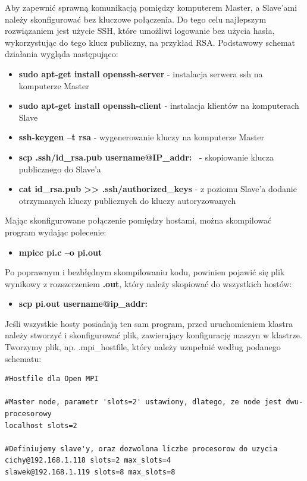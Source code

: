 \documentclass[a4paper,12pt]{article}		%
\begin{document}
Aby zapewnić sprawną komunikacją pomiędzy komputerem Master, a Slave’ami należy skonfigurować bez kluczowe połączenia. Do tego celu najlepszym rozwiązaniem jest użycie SSH, które umożliwi logowanie bez użycia hasła, wykorzystując do tego klucz publiczny, na przykład RSA. Podstawowy schemat działania wygląda następująco:
\begin{itemize}
\item \textbf{sudo apt-get install openssh-server} - instalacja serwera ssh na komputerze Master
\item \textbf{sudo apt-get install openssh-client} - instalacja klientów na komputerach Slave
\item \textbf{ssh-keygen –t rsa} - wygenerowanie kluczy na komputerze Master
\item \textbf{scp .ssh/id\_rsa.pub username@IP\_addr:~} - skopiowanie klucza publicznego do Slave'a
\item \textbf{cat id\_rsa.pub >> .ssh/authorized\_keys} - z poziomu Slave'a dodanie otrzymanych kluczy publicznych do  kluczy autoryzowanych
\end{itemize}

Mając skonfigurowane połączenie pomiędzy hostami, można skompilować program wydając polecenie: 

\begin{itemize}
\item \textbf{mpicc pi.c –o pi.out}
\end{itemize}

Po poprawnym i bezbłędnym skompilowaniu kodu, powinien pojawić się plik wynikowy z rozszerzeniem \textbf{.out}, który należy skopiować do wszystkich hostów:

\begin{itemize}
\item \textbf{scp pi.out username@ip\_addr:~}
\end{itemize}

Jeśli wszystkie hosty posiadają ten sam program, przed uruchomieniem klastra należy stworzyć i skonfigurować plik, zawierający konfigurację maszyn w klastrze. Tworzymy plik, np. .mpi\_hostfile, który należy uzupełnić według podanego schematu:

\begin{lstlisting}
#Hostfile dla Open MPI

#Master node, parametr 'slots=2' ustawiony, dlatego, ze node jest dwu-procesorowy
localhost slots=2

#Definiujemy slave'y, oraz dozwolona liczbe procesorow do uzycia
cichy@192.168.1.118 slots=2 max_slots=4
slawek@192.168.1.119 slots=8 max_slots=8
\end{lstlisting}
\end{document}
